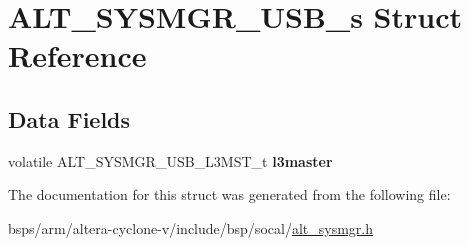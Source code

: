 \hypertarget{structALT__SYSMGR__USB__s}{}\section{A\+L\+T\+\_\+\+S\+Y\+S\+M\+G\+R\+\_\+\+U\+S\+B\+\_\+s Struct Reference}
\label{structALT__SYSMGR__USB__s}
\subsection*{Data Fields}
\begin{DoxyCompactItemize}
\item 
\mbox{\label{structALT__SYSMGR__USB__s_a798331af51bb1229b3a26668dd9e9247}} 
volatile A\+L\+T\+\_\+\+S\+Y\+S\+M\+G\+R\+\_\+\+U\+S\+B\+\_\+\+L3\+M\+S\+T\+\_\+t {\bfseries l3master}
\end{DoxyCompactItemize}


The documentation for this struct was generated from the following file\+:\begin{DoxyCompactItemize}
\item 
bsps/arm/altera-\/cyclone-\/v/include/bsp/socal/\mbox{\hyperlink{alt__sysmgr_8h}{alt\+\_\+sysmgr.\+h}}\end{DoxyCompactItemize}
